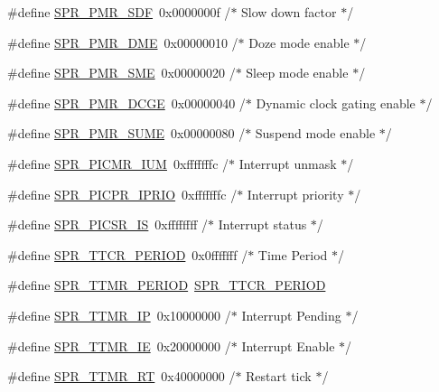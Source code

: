 \begin{DoxyCompactItemize}
\item 
\#define \hyperlink{spr-defs_8h_a2e84e200e1e9350a39079c4866457703}{\-S\-P\-R\-\_\-\-P\-M\-R\-\_\-\-S\-D\-F}~0x0000000f  /$\ast$ Slow down factor $\ast$/
\item 
\#define \hyperlink{spr-defs_8h_aa362aac102d66ef467e767382f885bd9}{\-S\-P\-R\-\_\-\-P\-M\-R\-\_\-\-D\-M\-E}~0x00000010  /$\ast$ Doze mode enable $\ast$/
\item 
\#define \hyperlink{spr-defs_8h_acde9b4da07c9f4fbdda53d3a24010f7d}{\-S\-P\-R\-\_\-\-P\-M\-R\-\_\-\-S\-M\-E}~0x00000020  /$\ast$ Sleep mode enable $\ast$/
\item 
\#define \hyperlink{spr-defs_8h_ad057ff01355779a0ba6ecc06dac1b5fc}{\-S\-P\-R\-\_\-\-P\-M\-R\-\_\-\-D\-C\-G\-E}~0x00000040  /$\ast$ Dynamic clock gating enable $\ast$/
\item 
\#define \hyperlink{spr-defs_8h_af852d0db197465cf9ae3878173b76c0a}{\-S\-P\-R\-\_\-\-P\-M\-R\-\_\-\-S\-U\-M\-E}~0x00000080  /$\ast$ Suspend mode enable $\ast$/
\item 
\#define \hyperlink{spr-defs_8h_ab9d32b9f67101d425d1207decfa2d56d}{\-S\-P\-R\-\_\-\-P\-I\-C\-M\-R\-\_\-\-I\-U\-M}~0xfffffffc  /$\ast$ Interrupt unmask $\ast$/
\item 
\#define \hyperlink{spr-defs_8h_aa351dd03fedb4a07e41f9aba086e7e0b}{\-S\-P\-R\-\_\-\-P\-I\-C\-P\-R\-\_\-\-I\-P\-R\-I\-O}~0xfffffffc  /$\ast$ Interrupt priority $\ast$/
\item 
\#define \hyperlink{spr-defs_8h_a555f4005776ad6c16e56a14022522ad1}{\-S\-P\-R\-\_\-\-P\-I\-C\-S\-R\-\_\-\-I\-S}~0xffffffff  /$\ast$ Interrupt status $\ast$/
\item 
\#define \hyperlink{spr-defs_8h_a5f417da4b2e57417e9db0f3138efc077}{\-S\-P\-R\-\_\-\-T\-T\-C\-R\-\_\-\-P\-E\-R\-I\-O\-D}~0x0fffffff  /$\ast$ Time Period $\ast$/
\item 
\#define \hyperlink{spr-defs_8h_ac7c16519629d6e32ef7e609cdc2cb0c0}{\-S\-P\-R\-\_\-\-T\-T\-M\-R\-\_\-\-P\-E\-R\-I\-O\-D}~\hyperlink{spr-defs_8h_a5f417da4b2e57417e9db0f3138efc077}{\-S\-P\-R\-\_\-\-T\-T\-C\-R\-\_\-\-P\-E\-R\-I\-O\-D}
\item 
\#define \hyperlink{spr-defs_8h_adaba976de9270d1478bcfc1fc1d4cae0}{\-S\-P\-R\-\_\-\-T\-T\-M\-R\-\_\-\-I\-P}~0x10000000  /$\ast$ Interrupt Pending $\ast$/
\item 
\#define \hyperlink{spr-defs_8h_ae038d897adbd532a373717141b9819e7}{\-S\-P\-R\-\_\-\-T\-T\-M\-R\-\_\-\-I\-E}~0x20000000  /$\ast$ Interrupt Enable $\ast$/
\item 
\#define \hyperlink{spr-defs_8h_a8fdbb0132ea818ec427a8791d496e50f}{\-S\-P\-R\-\_\-\-T\-T\-M\-R\-\_\-\-R\-T}~0x40000000  /$\ast$ Restart tick $\ast$/

\end{DoxyCompactItemize}
